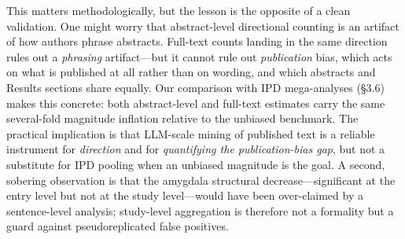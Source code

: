 \documentclass[11pt]{article}
\begin{document}
This matters methodologically, but the lesson is the opposite of a clean
validation. One might worry that abstract-level directional counting is an
artifact of how authors phrase abstracts. Full-text counts landing in the same
direction rules out a \emph{phrasing} artifact---but it cannot rule out
\emph{publication} bias, which acts on what is published at all rather than on
wording, and which abstracts and Results sections share equally. Our comparison
with IPD mega-analyses (\S3.6) makes this concrete: both abstract-level and
full-text estimates carry the same several-fold magnitude inflation relative to
the unbiased benchmark. The practical implication is that LLM-scale mining of
published text is a reliable instrument for \emph{direction} and for
\emph{quantifying the publication-bias gap}, but not a substitute for IPD pooling
when an unbiased magnitude is the goal. A second, sobering observation is that
the amygdala structural decrease---significant at the entry level but not at the
study level---would have been over-claimed by a sentence-level analysis;
study-level aggregation is therefore not a formality but a guard against
pseudoreplicated false positives.
\end{document}
